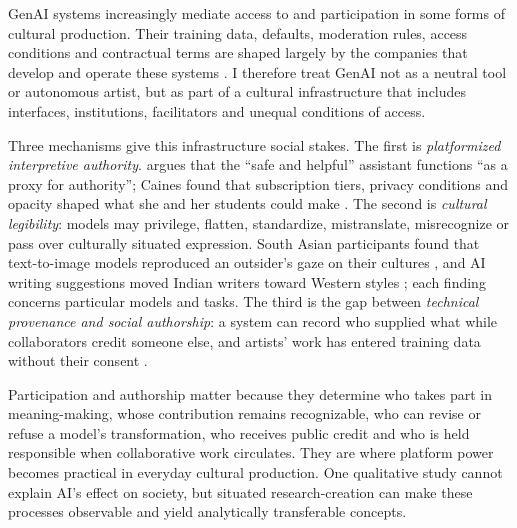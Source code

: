 GenAI systems increasingly mediate access to and participation in some forms
of cultural production. Their training data, defaults, moderation rules,
access conditions and contractual terms are shaped largely by the companies
that develop and operate these systems \citep[276]{richards2025}. I therefore treat GenAI not as a neutral
tool or autonomous artist, but as part of a cultural infrastructure that
includes interfaces, institutions, facilitators and unequal conditions of
access.

Three mechanisms give this infrastructure social stakes. The first is \emph{platformized interpretive
authority}. \citet[276]{richards2025} argues that the ``safe and helpful''
assistant functions ``as a proxy for authority''; Caines found that
subscription tiers, privacy conditions and opacity shaped what she and her
students could make \citep[187--188, 194]{caines2026steaming}. The second is \emph{cultural
legibility}: models may privilege, flatten, standardize, mistranslate,
misrecognize or pass over culturally situated expression. South Asian
participants found that text-to-image models reproduced an outsider's gaze
on their cultures \citep{qadri2023}, and AI writing suggestions moved Indian
writers toward Western styles \citep{agarwal2025}; each finding concerns
particular models and tasks. The third is the gap between
\emph{technical provenance and social authorship}: a system can record who
supplied what while collaborators credit someone else, and artists' work has
entered training data without their consent \citep{jiang2023}.

Participation and authorship matter because they determine who takes part
in meaning-making, whose contribution remains recognizable, who can revise
or refuse a model's transformation, who receives public credit and who is
held responsible when collaborative work circulates. They are where platform
power becomes practical in everyday cultural production.%
\ifformalversion\else{} One qualitative
study cannot explain AI's effect on society, but situated research-creation
can make these processes observable and yield analytically transferable
concepts.\fi
